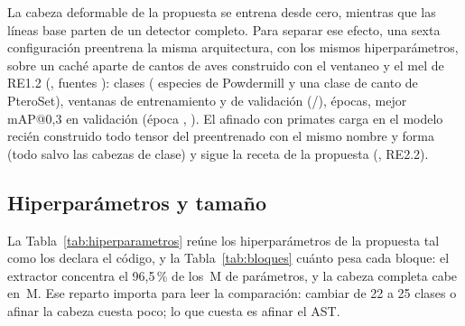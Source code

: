 \documentclass[12pt,a4paper]{article}
\begin{document}
La cabeza deformable de la propuesta se entrena desde cero, mientras que las líneas base
parten de un detector completo. Para separar ese efecto, una sexta configuración preentrena
la misma arquitectura, con los mismos hiperparámetros, sobre un caché aparte de cantos de aves
construido con el ventaneo y el mel de RE1.2 (, fuentes
\birdSources{}): \nBirdClasses{} clases (\nBirdSpecies{} especies de Powdermill y una clase
de canto de PteroSet), \nBirdWindowsTrain{} ventanas de entrenamiento y \nBirdWindowsVal{} de
validación (\birdSplitTrain{}/\birdSplitVal{}), \birdEpochs{} épocas, mejor mAP@0,3 en
validación \birdBestMap{} (época \birdBestEpoch{}, ). El
afinado con primates carga en el modelo recién construido todo tensor del preentrenado con el
mismo nombre y forma (todo salvo las cabezas de clase) y sigue la receta de la propuesta
(, RE2.2). 

\subsection{Hiperparámetros y tamaño}

La Tabla~\ref{tab:hiperparametros} reúne los hiperparámetros de la propuesta tal como los
declara el código, y la Tabla~\ref{tab:bloques} cuánto pesa cada bloque: el extractor
concentra el 96,5\,\% de los \nParams{}\,M de parámetros, y la cabeza completa cabe
en \nParamsHead{}\,M. Ese reparto importa para leer la comparación: cambiar de 22 a 25 clases
o afinar la cabeza cuesta poco; lo que cuesta es afinar el AST.
\end{document}
